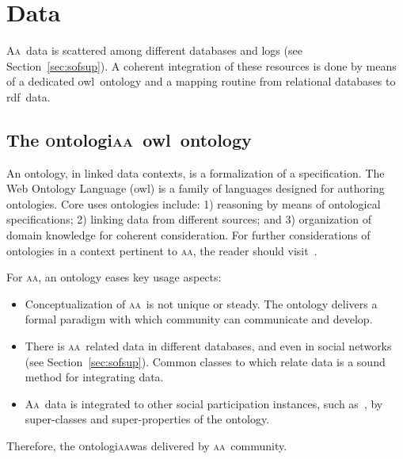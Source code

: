 \documentclass[a4paper, 11pt]{article} %
\newcommand{\aab}{\textsc{aa}}
\newcommand{\aai}{\textsc{Aa}}
\newcommand{\ontologiaa}{\textsc{o}ntologi\textsc{aa}}
\newcommand{\owl}{{\sc owl}}
\newcommand{\rdf}{{\sc rdf}}
\begin{document}
\section{Data}\label{sec:data}
\aai\ data is scattered among different databases and logs (see Section~\ref{sec:sofsup}). A coherent integration of these resources is done by means of a dedicated \owl\ ontology and a mapping routine from relational databases to \rdf\ data.

\subsection{The \ontologiaa\ \owl\ ontology}\label{sec:ont}
An ontology, in linked data contexts, is a formalization of a specification. The Web Ontology Language (\owl) is a family of languages designed for authoring ontologies. Core uses ontologies include: 1) reasoning by means of ontological specifications; 2) linking data from different sources; and 3) organization of domain knowledge for coherent consideration. For further considerations of ontologies in a context  pertinent to \aab, the reader should visit~\cite{OPS,pnud5}.

For \aab, an ontology eases key usage aspects:
\begin{itemize}
    \item Conceptualization of \aab\ is not unique or steady. The ontology delivers a formal paradigm with which community can communicate and develop.
    \item There is \aab\ related data in different databases, and even in social networks (see Section~\ref{sec:sofsup}). Common classes to which relate data is a sound method for integrating data.
    \item \aai\ data is integrated to other social participation instances, such as~\cite{participa,cd}, by super-classes and super-properties of the ontology.
\end{itemize}

Therefore, the \ontologiaa was delivered by \aab\ community.
\end{document}
